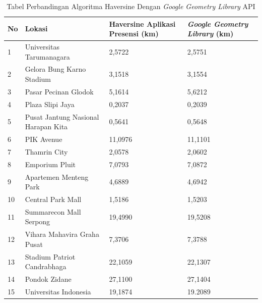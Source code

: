 \begin{longtable}{ |p{1cm}|p{3cm}|p{3cm}|p{3cm}|}
\caption{Tabel Perbandingan Algoritma Haversine Dengan \textit{Google Geometry Library} API}\label{tab:table-perbandingan-haversine-dan-google} 
\\
\hline
\textbf{No}
&\textbf{Lokasi}
&\textbf{Haversine Aplikasi Presensi (km)}
&\textbf{\textit{Google Geometry Library} (km)}
\\ 
\hline

\multirow{1}{*}{1}
&Universitas Tarumanagara
&2,5722
&2,5751
\\
\hline

\multirow{1}{*}{2}
&Gelora Bung Karno Stadium
&3,1518
&3,1554
\\
\hline

\multirow{1}{*}{3}
&Pasar Pecinan Glodok
&5,1614
&5,6212
\\
\hline

\multirow{1}{*}{4}
&Plaza Slipi Jaya
&0,2037
&0,2039
\\
\hline

\multirow{1}{*}{5}
&Pusat Jantung Nasional Harapan Kita
&0,5641
&0,5648
\\
\hline

\multirow{1}{*}{6}
&PIK Avenue
&11,0976
&11,1101
\\
\hline

\multirow{1}{*}{7}
&Thamrin City
&2,0578
&2,0602
\\
\hline

\multirow{1}{*}{8}
&Emporium Pluit
&7,0793
&7,0872
\\
\hline

\multirow{1}{*}{9}
&Apartemen Menteng Park
&4,6889
&4,6942
\\
\hline

\multirow{1}{*}{10}
&Central Park Mall
&1,5186
&1,5203
\\
\hline

\multirow{1}{*}{11}
&Summarecon Mall Serpong
&19,4990
&19,5208
\\
\hline

\multirow{1}{*}{12}
&Vihara Mahavira Graha Pusat
&7,3706
&7,3788
\\
\hline

\multirow{1}{*}{13}
&Stadium Patriot Candrabhaga
&22,1059
&22,1307
\\
\hline

\multirow{1}{*}{14}
&Pondok Zidane
&27,1100
&27,1404
\\
\hline

\multirow{1}{*}{15}
&Universitas Indonesia
&19,1874
&19.2089
\\
\hline


\end{longtable}

